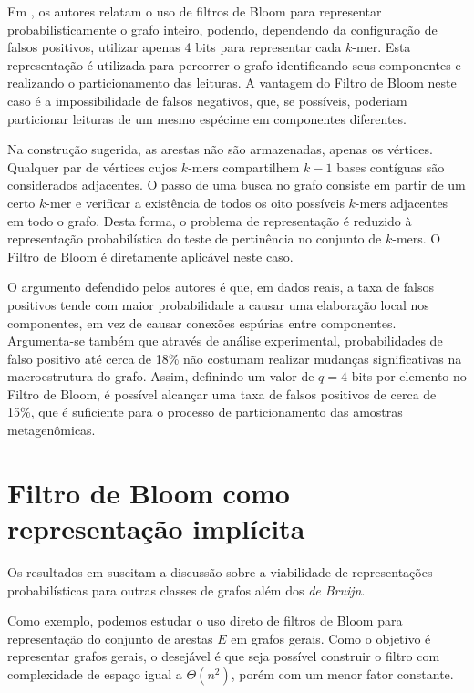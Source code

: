 Em \cite{pell2012scaling}, os autores relatam o uso de filtros de Bloom para representar probabilisticamente o grafo inteiro, podendo, dependendo da configuração de falsos positivos, utilizar apenas 4 bits para representar cada $k$-mer. Esta representação é utilizada para percorrer o grafo identificando seus componentes e realizando o particionamento das leituras. A vantagem do Filtro de Bloom neste caso é a impossibilidade de falsos negativos, que, se possíveis, poderiam particionar leituras de um mesmo espécime em componentes diferentes.

Na construção sugerida, as arestas não são armazenadas, apenas os vértices. Qualquer par de vértices cujos $k$-mers compartilhem $k-1$ bases contíguas são considerados adjacentes. O passo de uma busca no grafo consiste em partir de um certo $k$-mer e verificar a existência de todos os oito possíveis $k$-mers adjacentes em todo o grafo. Desta forma, o problema de representação é reduzido à representação probabilística do teste de pertinência no conjunto de $k$-mers. O Filtro de Bloom é diretamente aplicável neste caso.

O argumento defendido pelos autores é que, em dados reais, a taxa de falsos positivos tende com maior probabilidade a causar uma elaboração local nos componentes, em vez de causar conexões espúrias entre componentes. Argumenta-se também que através de análise experimental, probabilidades de falso positivo até cerca de 18\% não costumam realizar mudanças significativas na macroestrutura do grafo. Assim, definindo um valor de $q = 4$ bits por elemento no Filtro de Bloom, é possível alcançar uma taxa de falsos positivos de cerca de 15\%, que é suficiente para o processo de particionamento das amostras metagenômicas.


\section{Filtro de Bloom como representação implícita}\label{sec:graphs:bloom}

Os resultados em \cite{pell2012scaling} suscitam a discussão sobre a viabilidade de representações probabilísticas para outras classes de grafos além dos \emph{de Bruijn}.

Como exemplo, podemos estudar o uso direto de filtros de Bloom para representação do conjunto de arestas $E$ em grafos gerais. Como o objetivo é representar grafos gerais, o desejável é que seja possível construir o filtro com complexidade de espaço igual a $\Theta(n^2)$, porém com um menor fator constante.

